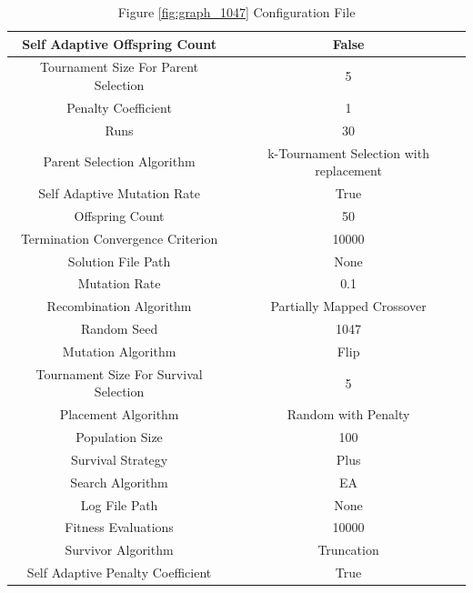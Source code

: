 \documentclass{standalone}
\begin{document}
\begin{table}[!htb]
	\centering
	\caption{Figure \ref{fig:graph_1047} Configuration File}
	\label{tab:graph_1047}
	\begin{tabular}{| c | c |}
		\hline
		Self Adaptive Offspring Count		& False		 \\
		\hline
		Tournament Size For Parent Selection		& 5		 \\
		\hline
		Penalty Coefficient		& 1		 \\
		\hline
		Runs		& 30		 \\
		\hline
		Parent Selection Algorithm		& k-Tournament Selection with replacement		 \\
		\hline
		Self Adaptive Mutation Rate		& True		 \\
		\hline
		Offspring Count		& 50		 \\
		\hline
		Termination Convergence Criterion		& 10000		 \\
		\hline
		Solution File Path		& None		 \\
		\hline
		Mutation Rate		& 0.1		 \\
		\hline
		Recombination Algorithm		& Partially Mapped Crossover		 \\
		\hline
		Random Seed		& 1047		 \\
		\hline
		Mutation Algorithm		& Flip		 \\
		\hline
		Tournament Size For Survival Selection		& 5		 \\
		\hline
		Placement Algorithm		& Random with Penalty		 \\
		\hline
		Population Size		& 100		 \\
		\hline
		Survival Strategy		& Plus		 \\
		\hline
		Search Algorithm		& EA		 \\
		\hline
		Log File Path		& None		 \\
		\hline
		Fitness Evaluations		& 10000		 \\
		\hline
		Survivor Algorithm		& Truncation		 \\
		\hline
		Self Adaptive Penalty Coefficient		& True		 \\
		\hline
	\end{tabular}
\end{table}
\end{document}
